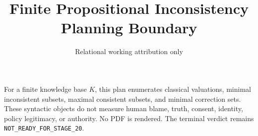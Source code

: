 \documentclass{article}
\title{Finite Propositional Inconsistency Planning Boundary}
\author{Relational working attribution only}
\begin{document}
\maketitle
For a finite knowledge base $K$, this plan enumerates classical valuations, minimal inconsistent subsets, maximal consistent subsets, and minimal correction sets. These syntactic objects do not measure human blame, truth, consent, identity, policy legitimacy, or authority. No PDF is rendered. The terminal verdict remains \texttt{NOT\_READY\_FOR\_STAGE\_20}.
\end{document}
